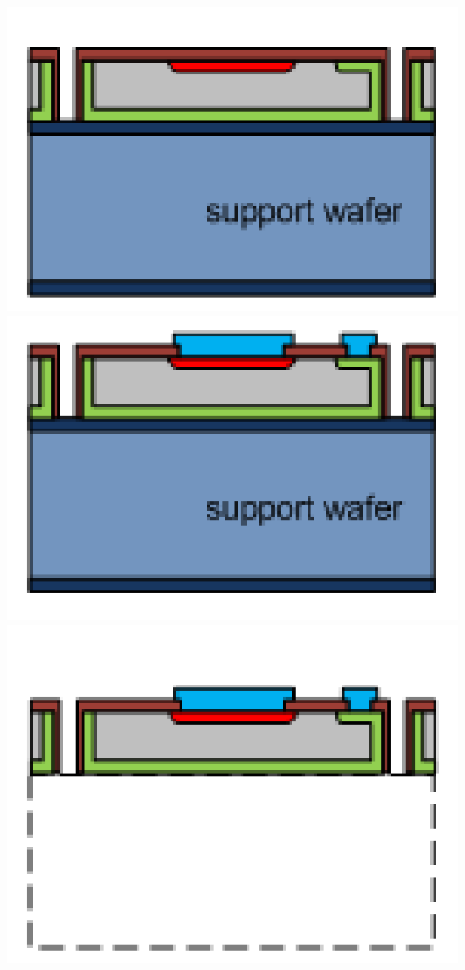 \begin{frame}
\begin{columns}
    \centering
    \includegraphics[width=\textwidth]{../figures/ActiveEdge/advacamProcess/wafer_7.pdf}\\
    \includegraphics[width=\textwidth]{../figures/ActiveEdge/advacamProcess/wafer_8.pdf}\\
    \includegraphics[width=\textwidth]{../figures/ActiveEdge/advacamProcess/wafer_9.pdf}

  \end{columns}

\end{frame}

